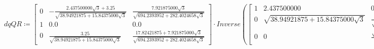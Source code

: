 \documentclass{article}
\begin{document}
\begin{dmath}\label{(5)}
\mathit{dqQR} \coloneqq \left[\begin{array}{ccc}
0 & -\frac{ 2.437500000 \sqrt{3}+ 3.25}{\sqrt{ 38.94921875+ 15.84375000 \sqrt{3}}} & \frac{ 7.921875000 \sqrt{3}}{\sqrt{ 694.2393952+ 282.4024658 \sqrt{3}}} 
\\
 1 &  0.0 &  0.0 
\\
 0 & \frac{ 3.25}{\sqrt{ 38.94921875+ 15.84375000 \sqrt{3}}} & \frac{ 17.82421875+ 7.921875000 \sqrt{3}}{\sqrt{ 694.2393952+ 282.4024658 \sqrt{3}}} 
\end{array}\right]\cdot \mathit{Inverse} \! \left(\left[\begin{array}{cccc}
1 &  2.437500000 & 0 & 1 
\\
 0 & \sqrt{ 38.94921875+ 15.84375000 \sqrt{3}} & \frac{ 6.50+ 2.437500000 \sqrt{3}}{\sqrt{ 38.94921875+ 15.84375000 \sqrt{3}}} &  0.0 
\\
 0 & 0 & \frac{\sqrt{ 694.2393952+ 282.4024658 \sqrt{3}}}{ 38.94921875+ 15.84375000 \sqrt{3}} &  0.0 
\end{array}\right]\right)\cdot \left[\begin{array}{c}
 0.5 
\\
 - 1.2 
\\
 0 
\end{array}\right]
\end{dmath}
\begin{Maple Normal}

\end{Maple Normal}
\end{document}
